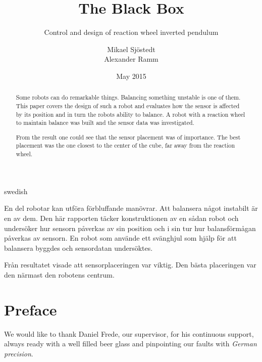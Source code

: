 \documentclass[a4paper,11pt]{kth-mag}
\title{The Black Box}
\subtitle{Control and design of reaction wheel inverted pendulum}
\author{Mikael Sjöstedt \\ Alexander Ramm}
\date{May 2015}
\begin{document}

\clearpage

\frontmatter
\pagestyle{plain}
{}
\maketitle
{}
\begin{abstract}
Some robots can do remarkable things. Balancing something unstable is one of them. This paper covers the design of such a robot and evaluates how the sensor is affected by its position and in turn the robots ability to balance. A robot with a reaction wheel to maintain balance was built and the sensor data was investigated.

From the result one could see that the sensor placement was of importance. The best placement was the one closest to the center of the cube, far away from the reaction wheel.
 
\end{abstract}
\cleardoublepage
\begin{foreignabstract}{swedish}
En del robotar kan utföra förbluffande manövrar. Att balansera något instabilt är en av dem. Den här rapporten täcker konstruktionen av en sådan robot och undersöker hur sensorn påverkas av sin position och i sin tur hur balansförmågan påverkas av sensorn. En robot som använde ett svänghjul som hjälp för att balansera byggdes och sensordatan undersöktes.

Från resultatet visade att sensorplaceringen var viktig. Den bästa placeringen var den närmast den robotens centrum.
\\


\end{foreignabstract}
\clearpage
\chapter*{Preface}
We would like to thank Daniel Frede, our supervisor, for his continuous support, always ready with a well filled beer glass and pinpointing our faults with \textit{German precision}.
\end{document}
